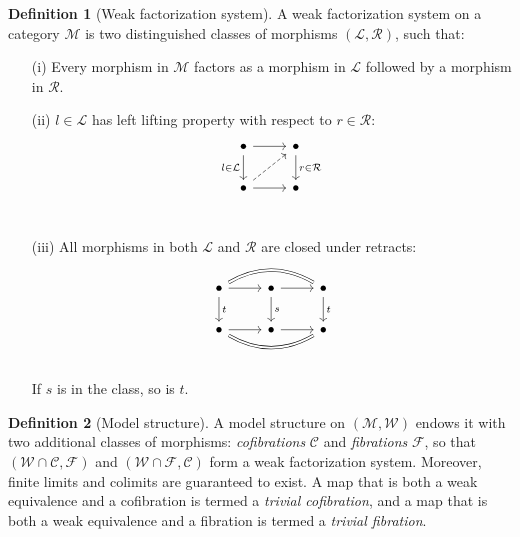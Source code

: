 \documentclass[10pt]{amsart}
\newcommand{\8}{\ensuremath{\infty}}
\newcommand{\0}{\ensuremath{\overset{\rightarrow}{0}}}
\newcommand{\1}{\ensuremath{\mathbf{1}}}
\newcommand{\M}{\ensuremath{\mathscr{M}}}
\newcommand{\Wcal}{\ensuremath{\mathcal{W}}}
\newcommand{\Ccal}{\ensuremath{\mathcal{C}}}
\newcommand{\Fcal}{\ensuremath{\mathcal{F}}}
\newcommand{\Lcal}{\ensuremath{\mathcal{L}}}
\newcommand{\Rcal}{\ensuremath{\mathcal{R}}}
\theoremstyle{definition}
\newtheorem{definition}{Definition}[section]
\numberwithin{definition}{subsection}
\numberwithin{definition}{section}
\begin{document}
\begin{definition}[Weak factorization system]
  A weak factorization system on a category $\M$ is two distinguished classes of morphisms $(\Lcal, \Rcal)$, such that:

  \begin{enumerate}
    \item[(i)] Every morphism in $\M$ factors as a morphism in $\Lcal$ followed by a morphism in $\Rcal$.
    \item[(ii)] $l \in \Lcal$ has left lifting property with respect to $r \in \Rcal$:
      \begin{equation*}
        \begin{tikzcd}
          \bullet \arrow[r] \arrow[d, "l \in \Lcal"'] & \bullet \arrow[d, "r \in \Rcal"] \\
          \bullet \arrow[ur, dashed] \arrow[r] & \bullet \\
        \end{tikzcd}
      \end{equation*}

    \item[(iii)] All morphisms in both $\Lcal$ and $\Rcal$ are closed under retracts:
      \begin{equation*}
        \begin{tikzcd}
          \bullet \arrow[d, "t"] \arrow[r] \arrow[rr, bend left, equals] & \bullet \arrow[d, "s"] \arrow[r] & \bullet \arrow[d, "t"] \\
          \bullet \arrow[r] \arrow[rr, bend right, equals] & \bullet \arrow[r] & \bullet \\
        \end{tikzcd}
      \end{equation*}

      If $s$ is in the class, so is $t$.
  \end{enumerate}
\end{definition}

\begin{definition}[Model structure]
  A model structure on $(\M, \Wcal)$ endows it with two additional classes of morphisms: \emph{cofibrations} $\Ccal$ and \emph{fibrations} $\Fcal$, so that $(\Wcal \cap \Ccal, \Fcal)$ and $(\Wcal \cap \Fcal, \Ccal)$ form a weak factorization system. Moreover, finite limits and colimits are guaranteed to exist. A map that is both a weak equivalence and a cofibration is termed a \emph{trivial cofibration}, and a map that is both a weak equivalence and a fibration is termed a \emph{trivial fibration}.
\end{definition}
\end{document}
